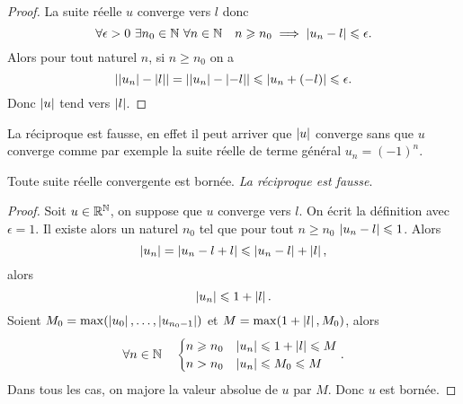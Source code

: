 \begin{proof}
  La suite réelle \(u\) converge vers \(l\) donc
  \begin{equation}
    \forall \epsilon>0 \ \exists n_0 \in \mathbb{N} \ \forall n \in \mathbb{N} \quad n\geqslant n_0 \implies \left\lvert u_n-l\right\rvert\leqslant \epsilon.
  \end{equation}
  Alors pour tout naturel \(n\), si \(n\geqslant n_0\) on a
  \begin{equation}
    \left\lvert\left\lvert u_n\right\rvert-\left\lvert l\right\rvert\right\rvert=\left\lvert\left\lvert u_n\right\rvert-\left\lvert-l\right\rvert\right\rvert\leqslant \left\lvert u_n+(-l)\right\rvert\leqslant \epsilon.
  \end{equation}
  Donc \(\left\lvert u\right\rvert\) tend vers \(\left\lvert l\right\rvert\).
\end{proof}
La réciproque est fausse, en effet il peut arriver que \(\left\lvert u\right\rvert\) converge sans que \(u\) converge comme par exemple la suite réelle de terme général \(u_n=(-1)^n\).
\begin{prop}
  Toute suite réelle convergente est bornée. \emph{La réciproque est fausse}.
\end{prop}
\begin{proof}
  Soit \(u\in \mathbb{R}^{\mathbb{N}}\), on suppose que \(u\) converge vers \(l\). On écrit la définition avec \(\epsilon=1\). Il existe alors un naturel \(n_0\) tel que pour tout \(n\geqslant n_0\) \(\left\lvert u_n-l\right\rvert\leqslant 1\). Alors
  \begin{equation}
    \left\lvert u_n\right\rvert=\left\lvert u_n-l+l\right\rvert\leqslant \left\lvert u_n-l\right\rvert+\left\lvert l\right\rvert,
  \end{equation}
  alors
  \begin{equation}
    \left\lvert u_n\right\rvert\leqslant 1+\left\lvert l\right\rvert.
  \end{equation}
  Soient \(M_0=\max(\left\lvert u_0\right\rvert,\ldots,\left\lvert u_{n_0-1}\right\rvert)\) et \(M=\max(1+\left\lvert l\right\rvert,M_0)\), alors
  \begin{equation}
    \forall n \in \mathbb{N} \quad
    \begin{cases}
      n \geqslant n_0 & \left\lvert u_n\right\rvert\leqslant 1+\left\lvert l\right\rvert\leqslant M \\
      n>n_0 & \left\lvert u_n\right\rvert\leqslant M_0\leqslant M
    \end{cases}.
  \end{equation}
  Dans tous les cas, on majore la valeur absolue de \(u\) par \(M\). Donc \(u\) est bornée.
\end{proof}

